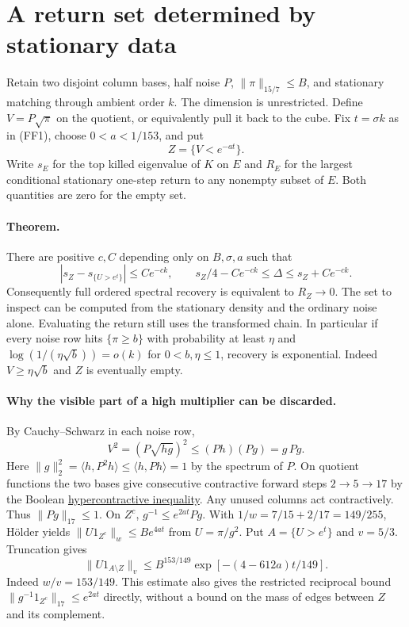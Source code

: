 \section{A return set determined by stationary data}
\label{sec:stationary-return-set}
Retain two disjoint column bases, half noise $P$, $\|\pi\|_{15/7}\le B$,
and stationary matching through ambient order $k$. The dimension is unrestricted.
Define $V=P\sqrt{\pi}$ on the quotient, or equivalently pull it back to the cube.
Fix $t=\sigma k$ as in (FF1), choose $0<a<1/153$, and put
\[
 Z=\{V<e^{-at}\}.
\]
Write $s_E$ for the top killed eigenvalue of $K$ on $E$ and $R_E$ for the
largest conditional stationary one-step return to any nonempty subset of $E$.
Both quantities are zero for the empty set.

\paragraph{Theorem.}
There are positive $c,C$ depending only on $B,\sigma,a$ such that
\[
 |s_Z-s_{\{U>e^t\}}|\le Ce^{-ck},\qquad
 s_Z/4-Ce^{-ck}\le\Delta\le s_Z+Ce^{-ck}.                 \tag{SR1}
\]
Consequently full ordered spectral recovery is equivalent to $R_Z\to0$.
The set to inspect can be computed from the stationary density and the ordinary
noise alone. Evaluating the return still uses the transformed chain.
In particular if every noise row hits $\{\pi\ge b\}$ with probability at least
$\eta$ and $\log(1/(\eta\sqrt b))=o(k)$ for $0<b,\eta\le1$, recovery is exponential.
Indeed $V\ge\eta\sqrt b$ and $Z$ is eventually empty.

\paragraph{Why the visible part of a high multiplier can be discarded.}
By Cauchy--Schwarz in each noise row,
\[
 V^2=(P\sqrt{hg})^2\le (Ph)(Pg)=g\,Pg.
\]
Here $\|g\|_2^2=\langle h,P^2h\rangle\le\langle h,Ph\rangle=1$ by the
spectrum of $P$. On quotient functions the two bases give consecutive
contractive forward steps $2\to5\to17$ by the Boolean
\href{https://doi.org/10.5802/aif.357}{hypercontractive inequality}.
Any unused columns act contractively. Thus $\|Pg\|_{17}\le1$.
On $Z^c$, $g^{-1}\le e^{2at}Pg$. With $1/w=7/15+2/17=149/255$,
H\"older yields $\|U1_{Z^c}\|_w\le B e^{4at}$ from $U=\pi/g^2$.
Put $A=\{U>e^t\}$ and $v=5/3$. Truncation gives
\[
 \|U1_{A\setminus Z}\|_v\le B^{153/149}
           \exp[-(4-612a)t/149].                            \tag{SR2}
\]
Indeed $w/v=153/149$. This estimate also gives the restricted reciprocal
bound $\|g^{-1}1_{Z^c}\|_{17}\le e^{2at}$ directly, without a bound on
the mass of edges between $Z$ and its complement.


